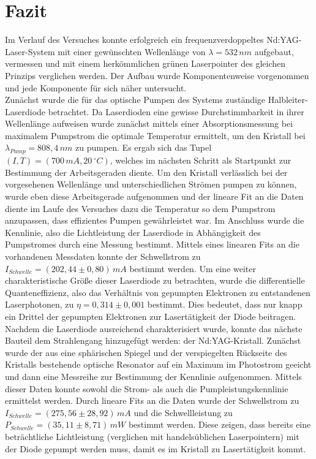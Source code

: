\documentclass[twoside,colorback,accentcolor=tud4c,11pt]{tudreport}
\begin{document}
\chapter{Fazit}
Im Verlauf des Versuches konnte erfolgreich ein frequenzverdoppeltes Nd:YAG-Laser-System mit einer gewünschten Wellenlänge von $\lambda=532\,\si{nm}$ aufgebaut, vermessen und mit einem herkömmlichen grünen Laserpointer des gleichen Prinzips verglichen werden. Der Aufbau wurde Komponentenweise vorgenommen und jede Komponente für sich näher untersucht.\\
Zunächst wurde die für das optische Pumpen des Systems zuständige Halbleiter-Laserdiode betrachtet. Da Laserdioden eine gewisse Durchstimmbarkeit in ihrer Wellenlänge aufweisen wurde zunächst mittels einer Absorptionsmessung bei maximalem Pumpstrom die optimale Temperatur ermittelt, um den Kristall bei $\lambda_{Pump}=808,4\,\si{nm}$ zu pumpen. Es ergab sich das Tupel $(I,T)=(700\,\si{mA},20\,\si{^{\circ}C})$, welches im nächsten Schritt als Startpunkt zur Bestimmung der Arbeitsgeraden diente. Um den Kristall verlässlich bei der vorgesehenen Wellenlänge und unterschiedlichen Strömen pumpen zu können, wurde eben diese Arbeitsgerade aufgenommen und der lineare Fit an die Daten diente im Laufe des Versuches dazu die Temperatur so dem Pumpstrom anzupassen, dass effizientes Pumpen gewährleistet war.
Im Anschluss wurde die Kennlinie, also die Lichtleistung der Laserdiode in Abhängigkeit des Pumpstromes durch eine Messung bestimmt. Mittels eines linearen Fits an die vorhandenen Messdaten konnte der Schwellstrom zu $I_{Schwelle}=(202,44\pm 0,80)\,\si{mA}$ bestimmt werden. Um eine weiter charakteristische Größe dieser Laserdiode zu betrachten, wurde die differentielle Quanteneffizienz, also das Verhältnis von gepumpten Elektronen zu entstandenen Laserphotonen, zu $\eta=0,314 \pm 0,001$ bestimmt. Dies bedeutet, dass nur knapp ein Drittel der gepumpten Elektronen zur Lasertätigkeit der Diode beitragen.\\
Nachdem die Laserdiode ausreichend charakterisiert wurde, konnte das nächste Bauteil dem Strahlengang hinzugefügt werden: der Nd:YAG-Kristall. Zunächst wurde der aus eine sphärischen Spiegel und der verspiegelten Rückseite des Kristalls bestehende optische Resonator auf ein Maximum im Photostrom geeicht und dann eine Messreihe zur Bestimmung der Kennlinie aufgenommen. Mittels dieser Daten konnte sowohl die Strom- als auch die Pumpleistungskennlinie ermittelst werden. Durch lineare Fits an die Daten wurde der Schwellstrom zu $I_{Schwelle}=(275,56\pm 28,92)\,\si{mA}$ und die Schwellleistung zu $P_{Schwelle}=(35,11\pm 8,71)\,\si{mW}$ bestimmt werden. Diese zeigen, dass bereits eine beträchtliche Lichtleistung (verglichen mit handelsüblichen Laserpointern) mit der Diode gepumpt werden muss, damit es im Kristall zu Lasertätigkeit kommt.
\end{document}
